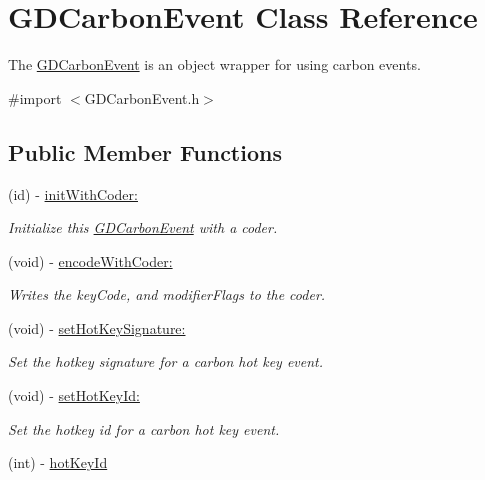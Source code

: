 \hypertarget{interface_g_d_carbon_event}{
\section{GDCarbonEvent Class Reference}
\label{interface_g_d_carbon_event}
}


The \hyperlink{interface_g_d_carbon_event}{GDCarbonEvent} is an object wrapper for using carbon events.  


{\ttfamily \#import $<$GDCarbonEvent.h$>$}\subsection*{Public Member Functions}
\begin{DoxyCompactItemize}
\item 
(id) -\/ \hyperlink{interface_g_d_carbon_event_a71262006d04ebd860b73e24a63dd0aa0}{initWithCoder:}
\begin{DoxyCompactList}\small\item\em Initialize this \hyperlink{interface_g_d_carbon_event}{GDCarbonEvent} with a coder. \item\end{DoxyCompactList}\item 
(void) -\/ \hyperlink{interface_g_d_carbon_event_af27ec25443a878f8d2a729a42a00f7d2}{encodeWithCoder:}
\begin{DoxyCompactList}\small\item\em Writes the keyCode, and modifierFlags to the coder. \item\end{DoxyCompactList}\item 
(void) -\/ \hyperlink{interface_g_d_carbon_event_a06f5898aa490cf71399ea4f62f6b3d73}{setHotKeySignature:}
\begin{DoxyCompactList}\small\item\em Set the hotkey signature for a carbon hot key event. \item\end{DoxyCompactList}\item 
(void) -\/ \hyperlink{interface_g_d_carbon_event_aa9d6d67191763d051b809abaf50ec6b0}{setHotKeyId:}
\begin{DoxyCompactList}\small\item\em Set the hotkey id for a carbon hot key event. \item\end{DoxyCompactList}\item 
\hypertarget{interface_g_d_carbon_event_adf3c1ed22030d170153cedc92b69d981}{
(int) -\/ \hyperlink{interface_g_d_carbon_event_adf3c1ed22030d170153cedc92b69d981}{hotKeyId}}
\label{interface_g_d_carbon_event_adf3c1ed22030d170153cedc92b69d981}


\end{DoxyCompactItemize}
